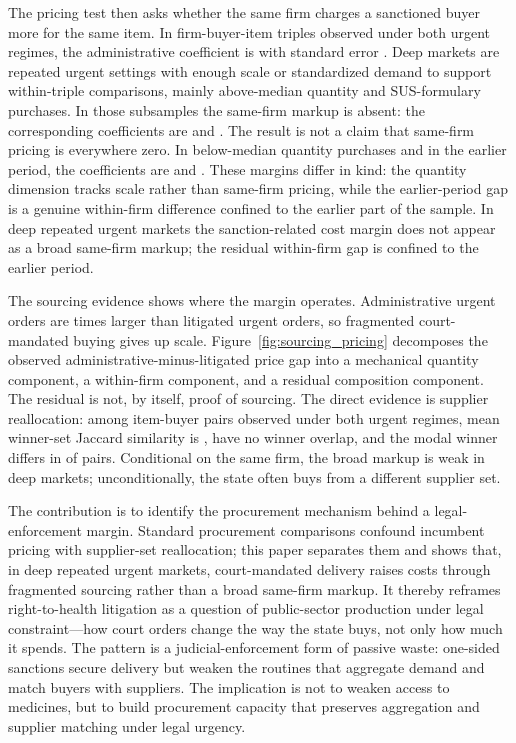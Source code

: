 The pricing test then asks whether the same firm charges a sanctioned buyer more for the same item. In firm-buyer-item triples observed under both urgent regimes, the administrative coefficient is \BPutgTripleCoefUTG{} with standard error \BPutgTripleSEUTG{}. Deep markets are repeated urgent settings with enough scale or standardized demand to support within-triple comparisons, mainly above-median quantity and SUS-formulary purchases. In those subsamples the same-firm markup is absent: the corresponding coefficients are \BPwfRobAboveQtyCoef{} and \BPwfRobSUSCoef{}. The result is not a claim that same-firm pricing is everywhere zero. In below-median quantity purchases and in the earlier period, the coefficients are \BPwfRobBelowQtyCoef{} and \BPwfRobEarlyCoef{}. These margins differ in kind: the quantity dimension tracks scale rather than same-firm pricing, while the earlier-period gap is a genuine within-firm difference confined to the earlier part of the sample. In deep repeated urgent markets the sanction-related cost margin does not appear as a broad same-firm markup; the residual within-firm gap is confined to the earlier period.

The sourcing evidence shows where the margin operates. Administrative urgent orders are \BPutgQtyAdminFoldPref{} times larger than litigated urgent orders, so fragmented court-mandated buying gives up scale. Figure~\ref{fig:sourcing_pricing} decomposes the observed administrative-minus-litigated price gap into a mechanical quantity component, a within-firm component, and a residual composition component. The residual is not, by itself, proof of sourcing. The direct evidence is supplier reallocation: among \BPwinnerSwitchIBpairs{} item-buyer pairs observed under both urgent regimes, mean winner-set Jaccard similarity is \BPwinnerSwitchJaccardMean{}, \BPwinnerSwitchNoOverlapPct{} have no winner overlap, and the modal winner differs in \BPwinnerSwitchDiffModalPct{} of pairs. Conditional on the same firm, the broad markup is weak in deep markets; unconditionally, the state often buys from a different supplier set.

The contribution is to identify the procurement mechanism behind a legal-enforcement margin. Standard procurement comparisons confound incumbent pricing with supplier-set reallocation; this paper separates them and shows that, in deep repeated urgent markets, court-mandated delivery raises costs through fragmented sourcing rather than a broad same-firm markup. It thereby reframes right-to-health litigation as a question of public-sector production under legal constraint---how court orders change the way the state buys, not only how much it spends. The pattern is a judicial-enforcement form of passive waste: one-sided sanctions secure delivery but weaken the routines that aggregate demand and match buyers with suppliers. The implication is not to weaken access to medicines, but to build procurement capacity that preserves aggregation and supplier matching under legal urgency.

